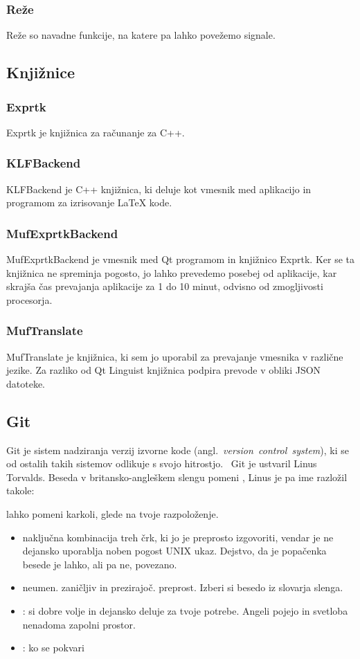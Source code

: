 \documentclass[12pt]{report}
\newcommand{\anglimp}[1]{angl.~\emph{#1}}
\newcommand{\angl}[1]{(\anglimp{#1})}
\begin{document}
			\subsubsection{Reže}
				Reže so navadne funkcije, na katere pa lahko povežemo signale.~\cite{qt_slots}
		\subsection{Knjižnice}
			\subsubsection{Exprtk}
				Exprtk je knjižnica za računanje za C++.~\cite{exprtk,exprtk_git}
			\subsubsection{KLFBackend}
				KLFBackend je C++ knjižnica, ki deluje kot vmesnik med aplikacijo in programom za izrisovanje \LaTeX{} kode.~\cite{qt_klf}
			\subsubsection{MufExprtkBackend}
				MufExprtkBackend je vmesnik med Qt programom in knjižnico Exprtk.
				Ker se ta knjižnica ne spreminja pogosto, jo lahko prevedemo posebej od aplikacije, kar skrajša čas prevajanja aplikacije za 1 do 10 minut, odvisno od zmogljivosti procesorja.
			\subsubsection{MufTranslate}
				MufTranslate je knjižnica, ki sem jo uporabil za prevajanje vmesnika v različne jezike.
				Za razliko od Qt Linguist knjižnica podpira prevode v obliki JSON datoteke.
		\subsection{Git}
			Git je sistem nadziranja verzij izvorne kode \angl{version~control~system}, ki se od ostalih takih sistemov odlikuje s svojo hitrostjo.~\cite{git}
			Git je ustvaril Linus Torvalds.
			Beseda  v britansko-angleškem slengu pomeni , Linus je pa ime razložil takole:~\cite{git_name}
			\begin{spacing}{0}
			 lahko pomeni karkoli, glede na tvoje razpoloženje.
			\begin{itemize}
				\item naključna kombinacija treh črk, ki jo je preprosto izgovoriti, vendar je ne dejansko uporablja noben pogost UNIX ukaz. Dejstvo, da je popačenka besede  je lahko, ali pa ne, povezano.
				\item neumen. zaničljiv in prezirajoč. preprost. Izberi si besedo iz slovarja slenga.
				\item {}: si dobre volje in dejansko deluje za tvoje potrebe. Angeli pojejo in svetloba nenadoma zapolni prostor.
				\item {}: ko se pokvari 
			\end{itemize}
			\end{spacing}
\end{document}
